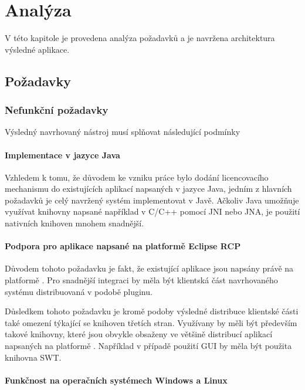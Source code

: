 \chapter{Analýza}

V této kapitole je provedena analýza požadavků a je navržena architektura
výsledné aplikace.



\section{Požadavky}

\subsection{Nefunkční požadavky}

Výsledný navrhovaný nástroj musí splňovat následující podmínky

\subsubsection*{Implementace v jazyce Java}

Vzhledem k tomu, že důvodem ke vzniku práce bylo dodání licencovacího mechanismu
do existujících aplikací napsaných v jazyce Java, jedním z hlavních požadavků
je celý navržený systém implementovat v Javě. Ačkoliv Java umožňuje využívat
knihovny napsané například v C/C++ pomocí \gls{JNI} nebo \gls{JNA}, je
použití nativních knihoven mnohem snadnější.


\subsubsection*{Podpora pro aplikace napsané na platformě Eclipse RCP}

Důvodem tohoto požadavku je fakt, že existující aplikace jsou napsány právě na
platformě . Pro snadnější integraci by měla být
klientská část navrhovaného systému distribuovaná v podobě pluginu.

Důsledkem tohoto požadavku je kromě podoby výsledné distribuce klientské části
také omezení týkající se knihoven třetích stran. Využívany by měli být především
takové knihovny, které jsou obvykle obsaženy ve většině distribucí aplikací
napsaných na platformě . Například v
případě použití \gls{GUI} by měla být použita knihovna \gls{SWT}.

\subsubsection*{Funkčnost na operačních systémech Windows a Linux}

